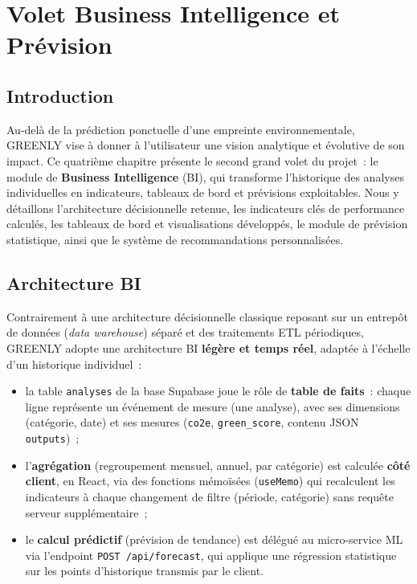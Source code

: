 \chapter{Volet Business Intelligence et Prévision}

\section*{Introduction}
Au-delà de la prédiction ponctuelle d'une empreinte environnementale, GREENLY vise à donner à l'utilisateur une vision analytique et évolutive de son impact. Ce quatrième chapitre présente le second grand volet du projet~: le module de \textbf{Business Intelligence} (BI), qui transforme l'historique des analyses individuelles en indicateurs, tableaux de bord et prévisions exploitables. Nous y détaillons l'architecture décisionnelle retenue, les indicateurs clés de performance calculés, les tableaux de bord et visualisations développés, le module de prévision statistique, ainsi que le système de recommandations personnalisées.

\section{Architecture BI}

Contrairement à une architecture décisionnelle classique reposant sur un entrepôt de données (\textit{data warehouse}) séparé et des traitements ETL périodiques, GREENLY adopte une architecture BI \textbf{légère et temps réel}, adaptée à l'échelle d'un historique individuel~:

\begin{itemize}[label=\textbullet,font=\normalsize]
    \item la table \texttt{analyses} de la base Supabase joue le rôle de \textbf{table de faits}~: chaque ligne représente un événement de mesure (une analyse), avec ses dimensions (catégorie, date) et ses mesures (\texttt{co2e}, \texttt{green\_score}, contenu JSON \texttt{outputs})~;
    \item l'\textbf{agrégation} (regroupement mensuel, annuel, par catégorie) est calculée \textbf{côté client}, en React, via des fonctions mémoïsées (\texttt{useMemo}) qui recalculent les indicateurs à chaque changement de filtre (période, catégorie) sans requête serveur supplémentaire~;
    \item le \textbf{calcul prédictif} (prévision de tendance) est délégué au micro-service ML via l'endpoint \texttt{POST~/api/forecast}, qui applique une régression statistique sur les points d'historique transmis par le client.
\end{itemize}


